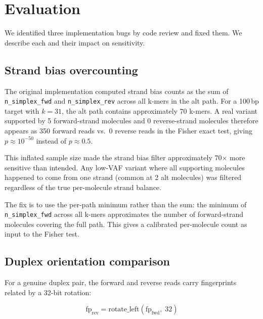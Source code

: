 \section{Evaluation}
\label{sec:evaluation}

We identified three implementation bugs by code review and fixed them.
We describe each and their impact on sensitivity.

\subsection{Strand bias overcounting}
\label{sec:eval:strandbias}

The original implementation computed strand bias counts as the sum of
\texttt{n\_simplex\_fwd} and \texttt{n\_simplex\_rev} across all k-mers in
the alt path.
For a 100\,bp target with $k = 31$, the alt path contains approximately 70
k-mers.
A real variant supported by 5 forward-strand molecules and 0 reverse-strand
molecules therefore appears as 350 forward reads vs.\ 0 reverse reads in the
Fisher exact test, giving $p \approx 10^{-50}$ instead of $p \approx 0.5$.

This inflated sample size made the strand bias filter approximately 70$\times$
more sensitive than intended.
Any low-VAF variant where all supporting molecules happened to come from one
strand (common at 2 alt molecules) was filtered regardless of the true
per-molecule strand balance.

The fix is to use the per-path minimum rather than the sum: the minimum of
\texttt{n\_simplex\_fwd} across all k-mers approximates the number of
forward-strand molecules covering the full path.
This gives a calibrated per-molecule count as input to the Fisher test.

\subsection{Duplex orientation comparison}
\label{sec:eval:duplex}

For a genuine duplex pair, the forward and reverse reads carry fingerprints
related by a 32-bit rotation:

\begin{equation*}
  \text{fp}_\text{rev} = \text{rotate\_left}(\text{fp}_\text{fwd},\; 32)
\end{equation*}

